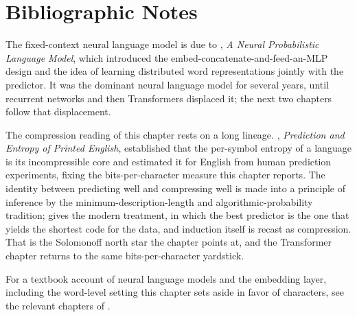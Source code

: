 
\section*{Bibliographic Notes}

The fixed-context neural language model is due to \textcite{bengio2003nplm},
\emph{A Neural Probabilistic Language Model}, which introduced the
embed-concatenate-and-feed-an-MLP design and the idea of learning
distributed word representations jointly with the predictor. It was the
dominant neural language model for several years, until recurrent networks
and then Transformers displaced it; the next two chapters follow that
displacement.

The compression reading of this chapter rests on a long lineage.
\textcite{shannon1951}, \emph{Prediction and Entropy of Printed English},
established that the per-symbol entropy of a language is its incompressible
core and estimated it for English from human prediction experiments,
fixing the bits-per-character measure this chapter reports. The identity
between predicting well and compressing well is made into a principle of
inference by the minimum-description-length and algorithmic-probability
tradition; \textcite{hutter2005uai} gives the modern treatment, in which
the best predictor is the one that yields the shortest code for the data,
and induction itself is recast as compression. That is the
Solomonoff north star the chapter points at, and the Transformer chapter
returns to the same bits-per-character yardstick.

For a textbook account of neural language models and the embedding layer,
including the word-level setting this chapter sets aside in favor of
characters, see the relevant chapters of \textcite{goodfellow2016dlbook}.
